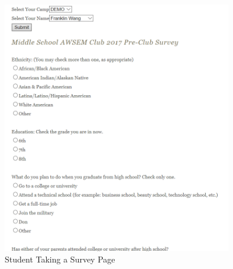 \documentclass[letterpaper,10pt,serif,draftclsnofoot,onecolumn,compsoc,titlepage]{IEEEtran}
\begin{document}
\begin{figure}[!htbp]
\centering
\includegraphics[scale=.2, width=100mm]{ProjectImages/StudentTakingSurvey.png}
\caption{Student Taking a Survey Page}
\label{fig:code2}
\end{figure}  


%
%
\end{document}
